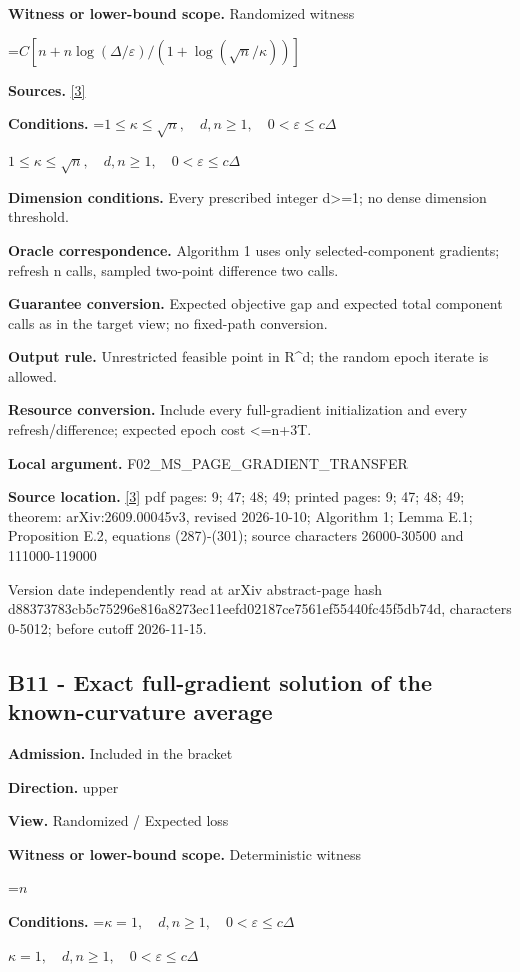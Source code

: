 \documentclass[10pt,a4paper]{article}
\newcommand{\AtlasMath}[1]{\par\begingroup\centering\setbox0=\hbox{$\displaystyle #1$}\ifdim\wd0>1.4\linewidth\typeout{ATLAS WIDE FORMULA: \the\wd0}\fi\ifdim\wd0>\linewidth\resizebox{\linewidth}{!}{\box0}\else\box0\fi\par\endgroup}
\newcommand{\AtlasInlineMath}[1]{\begingroup\setbox0=\hbox{$#1$}\ifdim\wd0>.4\linewidth\endgroup\AtlasMath{#1}\else\endgroup$#1$\fi}
\begin{document}
\textbf{Witness or lower-bound scope.} Randomized witness

\AtlasMath{C[n+n\log(\Delta/\varepsilon)/(1+\log(\sqrt n/\kappa))]}
\textbf{Sources.} \href{https://arxiv.org/pdf/2609.00045v3}{[3]}

\textbf{Conditions.} \AtlasInlineMath{1\le\kappa\le\sqrt n,\quad d,n\ge1,\quad0<\varepsilon\le c\Delta}

\textbf{Dimension conditions.} Every prescribed integer d>=1; no dense dimension threshold.

\textbf{Oracle correspondence.} Algorithm 1 uses only selected-component gradients; refresh n calls, sampled two-point difference two calls.

\textbf{Guarantee conversion.} Expected objective gap and expected total component calls as in the target view; no fixed-path conversion.

\textbf{Output rule.} Unrestricted feasible point in R\textasciicircum{}d; the random epoch iterate is allowed.

\textbf{Resource conversion.} Include every full-gradient initialization and every refresh/difference; expected epoch cost <=n+3T.

\textbf{Local argument.} F02\_\allowbreak{}MS\_\allowbreak{}PAGE\_\allowbreak{}GRADIENT\_\allowbreak{}TRANSFER

\textbf{Source location.} \href{https://arxiv.org/pdf/2609.00045v3}{[3]} pdf pages: 9; 47; 48; 49; printed pages: 9; 47; 48; 49; theorem: arXiv:2609.00045v3, revised 2026-10-10; Algorithm 1; Lemma E.1; Proposition E.2, equations (287)-(301); source characters 26000-30500 and 111000-119000

Version date independently read at arXiv abstract-page hash d88373783cb5c75296e816a8273ec11eefd02187ce7561ef55440fc45f5db74d, characters 0-5012; before cutoff 2026-11-15.

\subsection{B11 - Exact full-gradient solution of the known-curvature average}
\textbf{Admission.} Included in the bracket

\textbf{Direction.} upper

\textbf{View.} Randomized / Expected loss

\textbf{Witness or lower-bound scope.} Deterministic witness

\AtlasMath{n}
\textbf{Conditions.} \AtlasInlineMath{\kappa=1,\quad d,n\ge1,\quad0<\varepsilon\le c\Delta}
\end{document}
